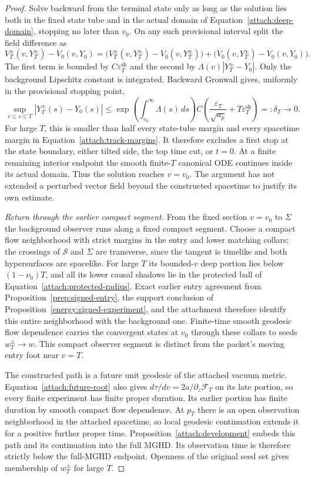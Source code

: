 \begin{proof}
Solve backward from the terminal state only as long as the solution
lies both in the fixed state tube and in the actual domain
of Equation~\eqref{attach:deep-domain}, stopping no later than
$v_0$. On any such provisional interval split the field difference
as
\[
 V_T^\pm(v,Y_T^\pm)-V_0(v,Y_0)
 =\bigl(V_T^\pm(v,Y_T^\pm)-V_0(v,Y_T^\pm)\bigr)
  +\bigl(V_0(v,Y_T^\pm)-V_0(v,Y_0)\bigr).
\]
The first term is bounded by $C\varepsilon_T^{\mathrm{sh}}$ and the second by
$\Lambda(v)|Y_T^\pm-Y_0|$. Only the background Lipschitz constant
is integrated. Backward Gronwall gives, uniformly in the provisional
stopping point,
\begin{equation}\label{attach:backward-error}
 \sup_{v\le s\le T}|Y_T^\pm(s)-Y_0(s)|
 \le \exp\!\left(\int_{v_0}^\infty\Lambda(s)\,ds\right)
       C\left(\frac{\varepsilon_T}{\sqrt{a_p}}+T\varepsilon_T^{\mathrm{sh}}\right)
 =:\delta_T\longrightarrow0.
\end{equation}
For large $T$, this is smaller than half every state-tube margin
and every spacetime margin in Equation~\eqref{attach:track-margins}.
It therefore excludes a first stop at the state boundary, either
tilted side, the top time cut, or $t=0$. At a finite remaining
interior endpoint the smooth finite-$T$ canonical ODE continues
inside its actual domain. Thus the solution reaches $v=v_0$.
The argument has not extended a perturbed vector field beyond the
constructed spacetime to justify its own estimate.

\emph{Return through the earlier compact segment.}
From the fixed section $v=v_0$ to $\Sigma$ the background observer
runs along a fixed compact segment. Choose a compact flow
neighborhood with strict margins in the entry and lower matching
collars; the crossings of $\mathcal S$ and $\Sigma$ are transverse,
since the tangent is timelike and both hypersurfaces are spacelike.
For large $T$ its bounded-$v$ deep portion lies below
$(1-\nu_0)T$, and all its lower causal shadows lie in the protected
ball of Equation~\eqref{attach:protected-radius}. Exact earlier entry agreement from Proposition~\ref{prep:signed-entry},
the support conclusion of Proposition~\ref{energy:signed-experiment},
and the attachment therefore identify this entire
neighborhood with the background one. Finite-time smooth geodesic
flow dependence carries the convergent states at $v_0$ through
these collars to seeds $w_T^\pm\to w$. This compact observer
segment is distinct from the packet's moving entry foot near
$v=T$.

The constructed path is a future unit geodesic of the attached
vacuum metric. Equation~\eqref{attach:future-root} also gives
$d\tau/dv=2a/\partial_z\mathcal F_T$ on its late portion, so every
finite experiment has finite proper duration. Its earlier portion
has finite duration by smooth compact flow dependence. At $p_T$
there is an open observation neighborhood in the attached spacetime,
so local geodesic continuation extends it for a positive further
proper time. Proposition~\ref{attach:development} embeds this path
and its continuation into the full MGHD. Its observation time is
therefore strictly below the full-MGHD endpoint. Openness of the
original seed set gives membership of $w_T^\pm$ for large $T$.


\end{proof}
